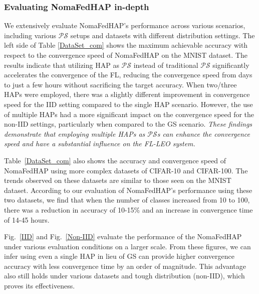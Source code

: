 \documentclass[letter,journal]{IEEEtran}
\begin{document}
\subsubsection{\bf Evaluating NomaFedHAP in-depth} We extensively evaluate NomaFedHAP's performance across various scenarios, including various $\mathcal {PS}$ setups and datasets with different distribution settings. The left side of Table \ref{DataSet_com} shows the maximum achievable accuracy with respect to the convergence speed of NomaFedHAP on the MNIST dataset. The results indicate that utilizing HAP as $\mathcal {PS}$ instead of traditional $\mathcal {PS}$ significantly accelerates the convergence of the FL, reducing the convergence speed from days to just a few hours without sacrificing the target accuracy. When two/three HAPs were employed, there was a slightly different improvement in convergence speed for the IID setting compared to the single HAP scenario. However, the use of multiple HAPs had a more significant impact on the convergence speed for the non-IID settings, particularly when compared to the GS scenario. {\em These findings demonstrate that employing multiple HAPs as $\mathcal {PS}$s can enhance the convergence speed and have a substantial influence on the FL-LEO system.}
    
Table~\ref{DataSet_com} also shows the accuracy and convergence speed of NomaFedHAP using more complex datasets of CIFAR-10 and CIFAR-100. The trends observed on these datasets are similar to those seen on the MNIST dataset. According to our evaluation of NomaFedHAP's performance using these two datasets, we find that when the number of classes increased from 10 to 100, there was a reduction in accuracy of 10-15\% and an increase in convergence time of 14-45 hours. %
    
Fig.~\ref{IID} and Fig.~\ref{Non-IID} evaluate the performance of the NomaFedHAP under various evaluation conditions on a larger scale. From these figures, we can infer using even a single HAP in lieu of GS can provide higher convergence accuracy with less convergence time by an order of magnitude. This advantage also still holds under various datasets and tough distribution (non-IID), which proves its effectiveness. 
\end{document}
